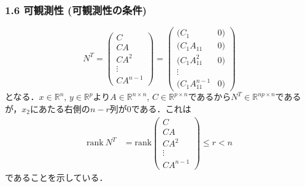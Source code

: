 \begin{frame}[t]
\frametitle{1.6 可観測性 (可観測性の条件)}
\begin{equation}
 N^T =
  \left(\begin{array}{c}
         C        \\
   C A      \\
   C A^2    \\
   \vdots   \\
   C A^{n-1}
  \end{array}\right)
 =
  \left(\begin{array}{lr}
       (C_1           & 0) \\
     (C_1 A_{11}       & 0) \\
     (C_1 A_{11}^2     & 0) \\
     \vdots   \\
     (C_1 A_{11}^{n-1} & 0)
  \end{array}\right)
\end{equation}
となる．$x \in {\mathbb R}^n$, $ y \in {\mathbb R}^p $より$A\in {\mathbb R}^{n \times n}$, $C \in {\mathbb R}^{p \times n}$であるから$N^T \in {\mathbb R}^{np \times n}$であるが，$x_2$にあたる右側の$n-r$列が$0$である．これは
\begin{align}
 \mbox{rank}\ N^T
 &= \mbox{rank}
  \left(\begin{array}{c}
         C        \\
   C A      \\
   C A^2    \\
   \vdots   \\
   C A^{n-1}
  \end{array}\right)
   \leq r < n
\end{align}
であることを示している．
\end{frame}


